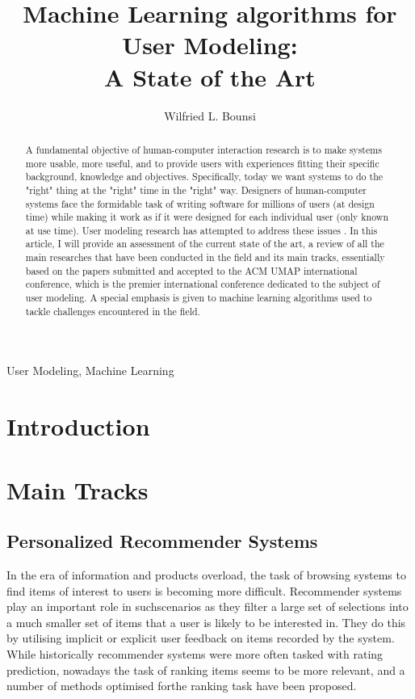 \documentclass[12pt]{article}
\title{Machine Learning algorithms for User Modeling:\\ A State of the Art}
\author{Wilfried L. Bounsi\inst{1}}
\begin{document}
 

\maketitle

\begin{abstract}
  A fundamental objective of human-computer interaction research is to make systems more usable, more useful, and to provide users with experiences fitting their specific background, knowledge and objectives. Specifically, today we want systems to do the "right" thing at the "right" time in the "right" way. Designers of human-computer systems face the formidable task of writing software for millions of users (at design time) while making it work as if it were designed for each individual user (only known at use time). User modeling research has attempted to address these issues \cite{Fischer2001}. In this article,
  I will provide an assessment of the current state of the art, a review of all the main researches that have been conducted in the field and its main tracks, essentially based on the papers submitted and accepted to the ACM UMAP international conference, which is the premier international conference dedicated to the subject of user modeling. A special emphasis is given to machine learning algorithms used to tackle challenges encountered in the field.
\end{abstract}
\begin{keywords}
User Modeling, Machine Learning
\end{keywords}

\section{Introduction}


\section{Main Tracks}
\subsection{Personalized Recommender Systems}
In the era of information and products overload, the task of browsing systems to find items of interest to users is becoming more difficult. Recommender systems play an important role in suchscenarios as they filter a large set of selections into a much smaller set of items that a user is likely to be interested in. They do this by utilising implicit or explicit user feedback on items recorded by the system. While historically recommender systems were more often tasked with rating prediction, nowadays the task of ranking items seems to be more relevant, and a number of methods optimised forthe ranking task have been proposed.
\end{document}
